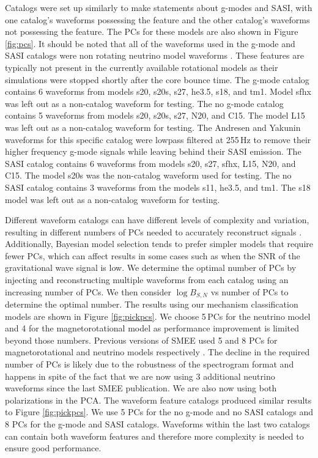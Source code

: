 \documentclass[letterpaper, aps, prd, twocolumn, superscriptaddress, showpacs, nofootinbib]{revtex4}
\begin{document}
Catalogs were set up similarly to make statements about g-modes and SASI, with one catalog's waveforms possessing the feature and the other catalog's waveforms not possessing the feature. The PCs for these models are also shown in Figure \ref{fig:pcs}. It should be noted that all of the waveforms used in the g-mode and SASI catalogs were non rotating neutrino model waveforms \cite{mueller:e12, kuroda:16, andresen:16, 2017arXiv170107325Y}. These features are typically not present in the currently available rotational models as their simulations were stopped shortly after the core bounce time. The g-mode catalog contains 6 waveforms from models s20, s20s, s27, he3.5, s18, and tm1. Model sfhx was left out as a non-catalog waveform for testing. The no g-mode catalog contains 5 waveforms from models s20, s20s, s27, N20, and C15. The model L15 was left out as a non-catalog waveform for testing. The Andresen and Yakunin waveforms for this specific catalog were lowpass filtered at 255\,Hz to remove their higher frequency g-mode signals while leaving behind their SASI emission. The SASI catalog contains 6 waveforms from models s20, s27, sfhx, L15, N20, and C15. The model s20s was the non-catalog waveform used for testing. The no SASI catalog contains 3 waveforms from the models s11, he3.5, and tm1. The s18 model was left out as a non-catalog waveform for testing.

Different waveform catalogs can have different levels of complexity and variation, resulting in different numbers of PCs needed to accurately reconstruct signals \cite{logue:12, powell:16b, 2017PhRvD..96l3013P}. Additionally, Bayesian model selection tends to prefer simpler models that require fewer PCs, which can affect results in some cases such as when the SNR of the gravitational wave signal is low. We determine the optimal number of PCs by injecting and reconstructing multiple waveforms from each catalog using an increasing number of PCs. We then consider $\log B_{S,N}$ vs number of PCs to determine the optimal number. The results using our mechanism classification models are shown in Figure \ref{fig:pickpcs}. We choose 5\,PCs for the neutrino model and 4 for the magnetorotational model as performance improvement is limited beyond those numbers. Previous versions of SMEE used 5 and 8 PCs for magnetorotational and neutrino models respectively \cite{2017PhRvD..96l3013P}. The decline in the required number of PCs is likely due to the robustness of the spectrogram format and happens in spite of the fact that we are now using 3 additional neutrino waveforms since the last SMEE publication. We are also now using both polarizations in the PCA. The waveform feature catalogs produced similar results to Figure \ref{fig:pickpcs}. We use 5 PCs for the no g-mode and no SASI catalogs and 8 PCs for the g-mode and SASI catalogs. Waveforms within the last two catalogs can contain both waveform features and therefore more complexity is needed to ensure good performance.
\end{document}
